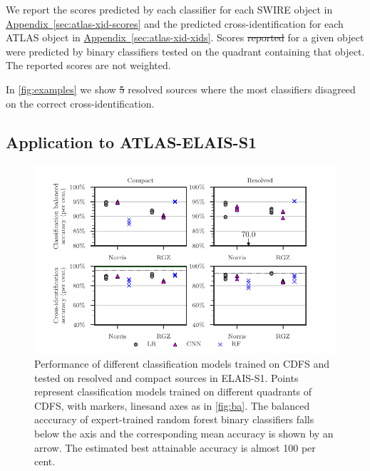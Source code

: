 \documentclass[11pt, a4paper]{book}
\newcommand{\aref}[1]{\hyperref[#1]{Appendix~\ref{#1}}}
\providecommand{\DIFaddtex}[1]{{\protect\color{blue}\uwave{#1}}} %
\providecommand{\DIFdeltex}[1]{{\protect\color{red}\sout{#1}}}                      %
\providecommand{\DIFaddbegin}{} %
\providecommand{\DIFaddend}{} %
\providecommand{\DIFdelbegin}{} %
\providecommand{\DIFdelend}{} %
\providecommand{\DIFaddFL}[1]{\DIFadd{#1}} %
\providecommand{\DIFaddbeginFL}{} %
\providecommand{\DIFaddendFL}{} %
\providecommand{\DIFadd}[1]{\texorpdfstring{\DIFaddtex{#1}}{#1}} %
\providecommand{\DIFdel}[1]{\texorpdfstring{\DIFdeltex{#1}}{}} %
\newcommand{\DIFscaledelfig}{0.5}
\newlength{\DIFdelgraphicswidth} %
\newlength{\DIFdelgraphicsheight} %
\newcommand{\DIFaddincludegraphics}[2][]{{\color{blue}\fbox{\DIFOincludegraphics[#1]{#2}}}} %
\newcommand{\DIFdelincludegraphics}[2][]{%
\sbox{\DIFdelgraphicsbox}{\DIFOincludegraphics[#1]{#2}}%
\settoboxwidth{\DIFdelgraphicswidth}{\DIFdelgraphicsbox} %
\settoboxtotalheight{\DIFdelgraphicsheight}{\DIFdelgraphicsbox} %
\scalebox{\DIFscaledelfig}{%
\parbox[b]{\DIFdelgraphicswidth}{\usebox{\DIFdelgraphicsbox}\\[-\baselineskip] \rule{\DIFdelgraphicswidth}{0em}}\llap{\resizebox{\DIFdelgraphicswidth}{\DIFdelgraphicsheight}{%
\setlength{\unitlength}{\DIFdelgraphicswidth}%
\begin{picture}(1,1)%
\thicklines\linethickness{2pt} %
{\color[rgb]{1,0,0}\put(0,0){\framebox(1,1){}}}%
{\color[rgb]{1,0,0}\put(0,0){\line( 1,1){1}}}%
{\color[rgb]{1,0,0}\put(0,1){\line(1,-1){1}}}%
\end{picture}%
}\hspace*{3pt}}} %
} %
\DeclareRobustCommand{\DIFaddbegin}{\DIFOaddbegin \let\includegraphics\DIFaddincludegraphics} %
\DeclareRobustCommand{\DIFaddend}{\DIFOaddend \let\includegraphics\DIFOincludegraphics} %
\DeclareRobustCommand{\DIFdelbegin}{\DIFOdelbegin \let\includegraphics\DIFdelincludegraphics} %
\DeclareRobustCommand{\DIFdelend}{\DIFOaddend \let\includegraphics\DIFOincludegraphics} %
\DeclareRobustCommand{\DIFaddbeginFL}{\DIFOaddbeginFL \let\includegraphics\DIFaddincludegraphics} %
\DeclareRobustCommand{\DIFaddendFL}{\DIFOaddendFL \let\includegraphics\DIFOincludegraphics} %
\begin{document}
    {We report the scores predicted by each classifier for each
    SWIRE object in \aref{sec:atlas-xid-scores} and the predicted
    cross-identification for each ATLAS object in \aref{sec:atlas-xid-xids}.
    Scores \DIFdelbegin \DIFdel{reported }\DIFdelend \DIFaddbegin \DIFadd{we report }\DIFaddend for a given object were predicted by binary
    classifiers tested on the quadrant containing that object. The reported scores are not weighted.}

    In \autoref{fig:examples} we show \DIFdelbegin \DIFdel{5 }\DIFdelend \DIFaddbegin \DIFadd{five }\DIFaddend resolved sources where the most classifiers disagreed on the correct cross-identification.

\subsection{Application to ATLAS-ELAIS-S1}
  \label{sec:atlas-xid-elais}

  \begin{figure}
  \centering
  \includegraphics[]{atlas-images/elais-grid-new.pdf}
  \caption[Performance of different classification models on the binary classification task, tested on ELAIS-S1.]{Performance of different classification models trained on CDFS and tested on
  resolved and compact sources in ELAIS-S1. Points represent classification models
  trained on different quadrants of CDFS, with markers, lines\DIFaddbeginFL \DIFaddFL{, }\DIFaddendFL and axes as in
  \autoref{fig:ba}. The balanced acccuracy of expert-trained random forest
  binary classifiers falls below the axis and the corresponding mean accuracy is
  shown by an arrow. The estimated best attainable accuracy is almost 100 per cent.
    \label{fig:elais-ba}}
  \end{figure}
\end{document}
